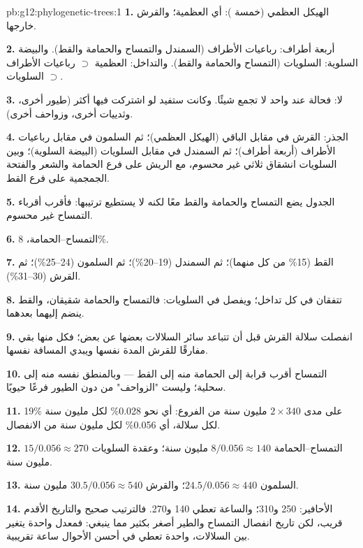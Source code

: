 \begin{solution}{pb:g12:phylogenetic-trees:1}
\textbf{1.} الهيكل العظمي (خمسة ): أي  العظمية؛ والقرش
خارجها.

\textbf{2.} أربعة أطراف: رباعيات الأطراف (السمندل والتمساح والحمامة
والقط). والبيضة السلوية: السلويات (التمساح والحمامة والقط). والتداخل:
 العظمية $\supset$ رباعيات الأطراف $\supset$ السلويات.

\textbf{3.} لا: فحالة عند  واحد لا تجمع شيئًا. وكانت ستفيد لو
اشتركت فيها  أكثر (طيور أخرى، وثدييات أخرى، وزواحف أخرى).

\textbf{4.} الجذر: القرش في مقابل الباقي (الهيكل العظمي)؛ ثم السلمون
في مقابل رباعيات الأطراف (أربعة أطراف)؛ ثم السمندل في مقابل السلويات
(البيضة السلوية)؛ وبين السلويات انشقاق ثلاثي غير محسوم، مع الريش على
فرع الحمامة والشعر والفتحة الجمجمية على فرع القط.

\textbf{5.} الجدول يضع التمساح والحمامة والقط معًا لكنه لا يستطيع
ترتيبها: فأقرب أقرباء التمساح غير محسوم.

\textbf{6.} التمساح--الحمامة، 8\%.

\textbf{7.} القط (15\% من كل منهما)؛ ثم السمندل (19--20\%)؛ ثم
السلمون (24--25\%)؛ ثم القرش (30--31\%).

\textbf{8.} تتفقان في كل تداخل؛ ويفصل  في السلويات: فالتمساح
والحمامة شقيقان، والقط ينضم إليهما بعدهما.

\textbf{9.} انفصلت سلالة القرش قبل أن تتباعد سائر السلالات بعضها عن
بعض؛ فكل منها بقي مفارقًا للقرش المدة نفسها ويبدي المسافة نفسها.

\textbf{10.} التمساح أقرب قرابة إلى الحمامة منه إلى القط --- وبالمنطق
نفسه منه إلى سحلية؛ وليست "الزواحف" من دون الطيور فرعًا حيويًا.

\textbf{11.} 19\% على مدى $2 \times 340$ مليون سنة من الفروع: أي نحو
0.028\% لكل مليون سنة لكل سلالة، أي 0.056\% لكل مليون سنة من
الانفصال.

\textbf{12.} التمساح--الحمامة $8/0.056 \approx 140$ مليون سنة؛ وعقدة
السلويات $15/0.056 \approx 270$ مليون سنة.

\textbf{13.} السلمون $24.5/0.056 \approx 440$؛ والقرش $30.5/0.056
\approx 540$ مليون سنة.

\textbf{14.} الأحافير: 250 و310؛ والساعة تعطي 140 و270. فالترتيب صحيح
والتاريخ الأقدم قريب، لكن تاريخ انفصال التمساح والطير أصغر بكثير مما
ينبغي: فمعدل  واحدة يتغير بين السلالات،  واحدة تعطي في
أحسن الأحوال ساعة تقريبية.


\end{solution}
